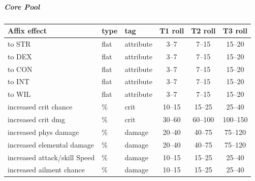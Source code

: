 \subparagraph{Core Pool}
\begin{center}
	\begin{tabular}{|l|l|l|c c c|}
		\hline
		\textbf{Affix effect} & \textbf{type} & \textbf{tag} & \textbf{T1 roll} & \textbf{T2 roll} & \textbf{T3 roll} \\
		\hline
		to STR                                & flat & attribute & 3--7   & 7--15   & 15--20  \\
		to DEX                                & flat & attribute & 3--7   & 7--15   & 15--20  \\
		to CON                                & flat & attribute & 3--7   & 7--15   & 15--20  \\
		to INT                                & flat & attribute & 3--7   & 7--15   & 15--20  \\
		to WIL                                & flat & attribute & 3--7   & 7--15   & 15--20  \\
		\hline
		increased crit chance                 & \%   & crit      & 10--15 & 15--25  & 25--40  \\
		increased crit dmg                    & \%   & crit      & 30--60 & 60--100 & 100--150 \\
		\hline
		increased phys damage                 & \%   & damage    & 20--40 & 40--75  & 75--120 \\
		increased elemental damage            & \%   & damage    & 20--40 & 40--75  & 75--120 \\
		increased attack/skill Speed          & \%   & damage      & 10--15 & 15--25  & 25--40  \\
		increased ailment chance              & \%   & damage      & 10--15 & 15--25  & 25--40  \\
		\hline
	\end{tabular}
\end{center}

